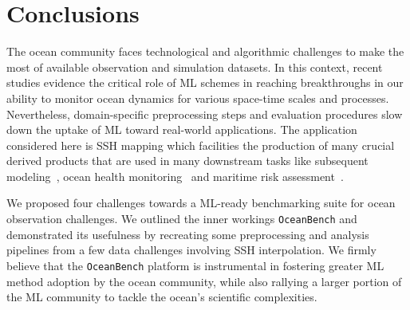 \section{Conclusions} \label{sec:conclusions}

The ocean community faces technological and algorithmic challenges to make the most of available observation and simulation datasets. 
In this context, recent studies evidence the critical role of ML schemes in reaching breakthroughs in our ability to monitor ocean dynamics for various space-time scales and processes. 
Nevertheless, domain-specific preprocessing steps and evaluation procedures slow down the uptake of ML toward real-world applications. 
The application considered here is SSH mapping which facilities the production of many crucial derived products that are used in many downstream tasks like subsequent modeling~\citep{ML4OCN}, ocean health monitoring~\citep{ML4NATURECONSERVATION,OCNHEALTH,OCEANHEALTH2} and maritime risk assessment~\citep{SSHOPERATIONAL}.

We proposed four challenges towards a ML-ready benchmarking suite for ocean observation challenges. 
We outlined the inner workings \texttt{OceanBench} and demonstrated its usefulness by recreating some preprocessing and analysis pipelines from a few data challenges involving SSH interpolation.
We firmly believe that the \texttt{OceanBench} platform is instrumental in fostering greater ML method adoption by the ocean community, while also rallying a larger portion of the ML community to tackle the ocean's scientific complexities.



